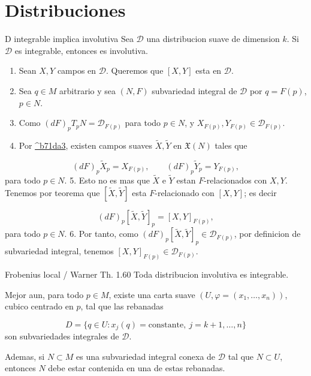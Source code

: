 \section{Distribuciones}
\begin{bookproposition}{D integrable implica involutiva}
Sea $\mathcal D$ una distribucion suave de dimension $k$. Si $\mathcal D$ es integrable, entonces es involutiva.

\end{bookproposition}
\begin{bookproof}{}
\begin{enumerate}
\item Sean $X,Y$ campos en $\mathcal D$. Queremos que $[X,Y]$ esta en $\mathcal D$.
\item Sea $q\in M$ arbitrario y sea $(N,F)$ subvariedad integral de $\mathcal D$ por $q=F(p)$, $p\in N$.
\item Como $(dF)_pT_pN=\mathcal D_{F(p)}$ para todo $p\in N$, y $X_{F(p)},Y_{F(p)}\in\mathcal D_{F(p)}$.
\item Por \hyperref[blk:b71da3]{\textasciicircum{}b71da3}, existen campos suaves $\widetilde X,\widetilde Y$ en $\mathfrak X(N)$ tales que
\end{enumerate}
\[
(dF)_p\widetilde X_p=X_{F(p)},\qquad (dF)_p\widetilde Y_p=Y_{F(p)},
\]
para todo $p\in N$. 5. Esto no es mas que $\widetilde X$ e $\widetilde Y$ estan $F$-relacionados con $X,Y$. Tenemos por teorema que $[\widetilde X,\widetilde Y]$ esta $F$-relacionado con $[X,Y]$; es decir

\[
(dF)_p[\widetilde X,\widetilde Y]_p=[X,Y]_{F(p)},
\]
para todo $p\in N$. 6. Por tanto, como $(dF)_p[\widetilde X,\widetilde Y]_p\in\mathcal D_{F(p)}$, por definicion de subvariedad integral, tenemos $[X,Y]_{F(p)}\in\mathcal D_{F(p)}$.

\bookqed
\end{bookproof}
\begin{booktheorem}{Frobenius local / Warner Th. 1.60}
Toda distribucion involutiva es integrable.

Mejor aun, para todo $p\in M$, existe una carta suave $(U,\varphi=(x_1,\ldots,x_n))$, cubico centrado en $p$, tal que las rebanadas

\[
D=\{q\in U:x_j(q)=\text{constante},\ j=k+1,\ldots,n\}
\]
son subvariedades integrales de $\mathcal D$.

Ademas, si $N\subset M$ es una subvariedad integral conexa de $\mathcal D$ tal que $N\subset U$, entonces $N$ debe estar contenida en una de estas rebanadas.

\end{booktheorem}
